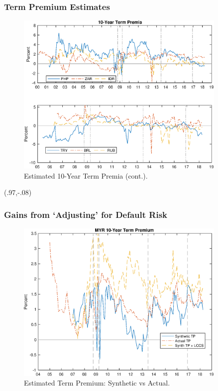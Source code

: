 \documentclass[12pt, aspectratio=169, xcolor=dvipsnames]{beamer} 			         %
\begin{document}
\begin{frame}
	\frametitle{Term Premium Estimates}
	\begin{figure}[!htbp]
		\begin{center}
			\includegraphics[width=0.9\textwidth,height=0.65\textheight]{../Figures/rp_10yr_2}
			\par\end{center}
		\caption{Estimated 10-Year Term Premia (cont.).}\label{fig:tp_10yrC}
	\end{figure}
	\begin{textblock*}{3cm}(.97\textwidth,-.08\textheight)
		\hyperlink{tp_10yrA}{}
	\end{textblock*}
\end{frame}

\begin{frame}
	\frametitle{Gains from `Adjusting' for Default Risk}
	\begin{figure}[!htbp]
		\begin{center}
			\includegraphics[width=0.9\textwidth,height=0.65\textheight]{../Figures/rp_cmp_10_MYR}
			\par\end{center}
		\caption{Estimated Term Premium: Synthetic vs Actual.}\label{fig:tp_comp_10yr}
	\end{figure}
\end{frame}
\end{document}
